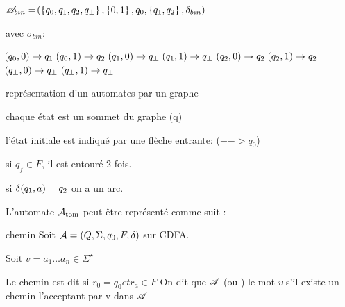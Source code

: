 \documentclass[a4paper,french,bookmarks]{book}
\newcommand{\Atom}{\mathop{\bcA_\text{tom}}\nolimits}
\begin{document}
    \begin{example}{}{}
        $\mathscr{A}_{bin} = \!\left(\left\{q_0, q_1, q_2, q_\bot\right\}, \left\{0, 1\right\}, q_0, \left\{q_1, q_2\right\}, \delta_{bin}\right)$
        
        avec $\sigma_{bin} :$
        \begin{enumerate}
            \itt $\!\left(q_0, 0\right) \to q_1$
            \itt $\!\left(q_0, 1\right) \to q_2$
            \itt $\!\left(q_1, 0\right) \to q_\bot$
            \itt $\!\left(q_1, 1\right) \to q_\bot$
            \itt $\!\left(q_2, 0\right) \to q_2$
            \itt $\!\left(q_2, 1\right) \to q_2$
            \itt $\!\left(q_\bot, 0\right) \to q_\bot$
            \itt $\!\left(q_\bot, 1\right) \to q_\bot$
        \end{enumerate}
    \end{example}
    \begin{notation}
        représentation d'un automates par un graphe
        
        \begin{enumerate}
            \itt chaque état est un sommet du graphe (q)
            
            \itt l'état initiale est indiqué par une flèche entrante: ($--> q_0$)
            
            \itt si $q_f \in F$, il est entouré 2 fois.
            
            \itt si $\delta \!\left(q_1, a\right) = q_2$ on a un arc.
            
            
        \end{enumerate}
        
        
    \end{notation}
     
    \begin{example}{}{}
        L'automate $\Atom$ peut être représenté comme suit :
        
        
    
        
    \end{example}
    \begin{definition}{chemin}{}
        Soit $\mathcal{A} = (Q,\Sigma, q_0, F, \delta)$ sur CDFA.
        
        
        Soit $v = a_1 \dots a_n  \in \Sigma^\star$ 
        
        Le chemin est dit  si $r_0 = q_0 et r_a \in F$
        On dit que $\mathscr{A}$  (ou ) le mot $v$ s'il existe un chemin l'acceptant par v dans $\mathscr{A}$
        
    \end{definition}
    
\end{document}
